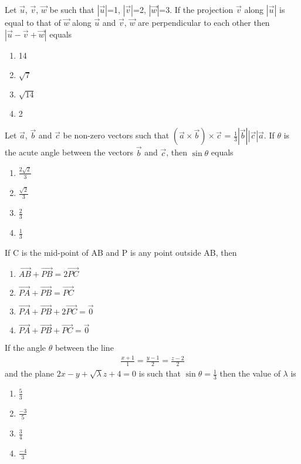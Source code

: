 \item Let $\overrightarrow{u}$, $\overrightarrow{v}$, $\overrightarrow{w}$ be such that $|\overrightarrow{u}|$=1, $|\overrightarrow{v}|$=2, $|\overrightarrow{w}|$=3. If the projection $\overrightarrow{v}$ along $|\overrightarrow{u}|$ is equal to that of $\overrightarrow{w}$ along $\overrightarrow{u}$ and $\overrightarrow{v}$, $\overrightarrow{w}$ are perpendicular to each other then $|\overrightarrow{u}-\overrightarrow{v}+\overrightarrow{w}|$ equals
\begin{enumerate}
\item 14
\item $\sqrt{7}$
\item $\sqrt{14}$
\item 2
\end{enumerate}

\item Let $\overrightarrow{a}$, $\overrightarrow{b}$ and $\overrightarrow{c}$ be non-zero vectors such that $(\overrightarrow{a} \times \overrightarrow{b}) \times \overrightarrow{c}$ = $\frac{1}{3}|\overrightarrow{b}||\overrightarrow{c}|\overrightarrow{a}$. If $\theta$ is the acute angle between the vectors $\overrightarrow{b}$ and $\overrightarrow{c}$, then $\sin\theta$ equals
\begin{enumerate}
\item $\frac{2\sqrt{2}}{3}$
\item $\frac{\sqrt{2}}{3}$
\item $\frac{2}{3}$
\item $\frac{1}{3}$
\end{enumerate}

\item If C is the mid-point of AB and P is any point outside AB, then 
\begin{enumerate}
\item $\overrightarrow{AB}+\overrightarrow{PB}=2\overrightarrow{PC}$
\item $\overrightarrow{PA}+\overrightarrow{PB}=\overrightarrow{PC}$
\item $\overrightarrow{PA}+\overrightarrow{PB}+2\overrightarrow{PC}=\overrightarrow{0}$
\item $\overrightarrow{PA}+\overrightarrow{PB}+\overrightarrow{PC}=\overrightarrow{0}$
\end{enumerate}

\item If the angle $\theta$ between the line 
\begin{align*}
\frac{x+1}{1}=\frac{y-1}{2}=\frac{z-2}{2}
\end{align*}
and the plane $2x-y+\sqrt{\lambda}z+4=0$ is such that $\sin\theta=\frac{1}{3}$ then the value of $\lambda$ is
\begin{enumerate}
\item $\frac{5}{3}$
\item $\frac{-3}{5}$
\item $\frac{3}{4}$
\item $\frac{-4}{3}$
\end{enumerate}

